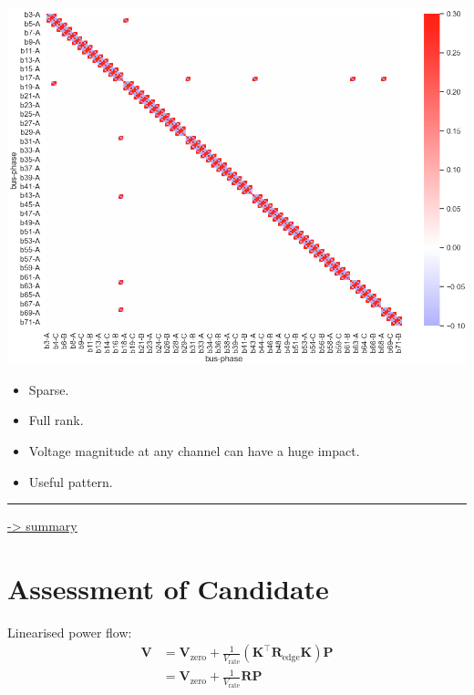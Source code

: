 \documentclass[
]{book}
\providecommand{\tightlist}{%
  \setlength{\itemsep}{0pt}\setlength{\parskip}{0pt}}
\begin{document}
\begin{center}\includegraphics{Pictures/figHeatmapBrmInv} \end{center}

\begin{itemize}
\tightlist
\item
  Sparse.
\item
  Full rank.
\item
  Voltage magnitude at any channel can have a huge impact.
\item
  Useful pattern.
\end{itemize}

\begin{center}\rule{0.5\linewidth}{0.5pt}\end{center}

\protect\hyperlink{summary}{-\textgreater{} summary}

\hypertarget{assessment}{%
\section{Assessment of Candidate}\label{assessment}}

Linearised power flow:
\[ \begin{aligned}
  \boldsymbol{V} &= \boldsymbol{V}_\text{zero} + \frac{1}{V_\text{rate}}
    \left(
      \boldsymbol{K}^{\top} \boldsymbol{R}_\text{edge} \boldsymbol{K}
    \right) \boldsymbol{P} \\
  {} &= \boldsymbol{V}_\text{zero}
      + \frac{1}{V_\text{rate}} \boldsymbol{R} \boldsymbol{P}
\end{aligned} \]
\end{document}
